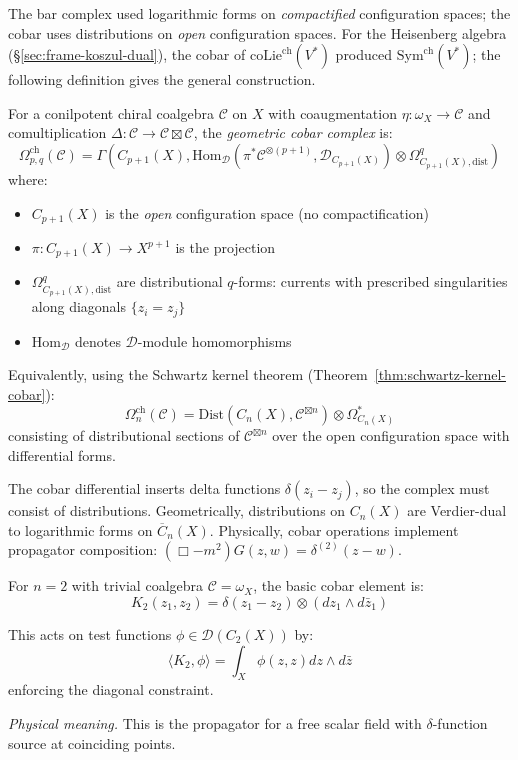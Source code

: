 \begin{definition}\label{def:geom-cobar}
The bar complex used logarithmic forms on \emph{compactified} configuration spaces; the cobar uses distributions on \emph{open} configuration spaces.  For the Heisenberg algebra (\S\ref{sec:frame-koszul-dual}), the cobar of $\mathrm{coLie}^{\mathrm{ch}}(V^*)$ produced $\mathrm{Sym}^{\mathrm{ch}}(V^*)$; the following definition gives the general construction.

For a conilpotent chiral coalgebra $\mathcal{C}$ on $X$ with coaugmentation
$\eta: \omega_X \to \mathcal{C}$ and comultiplication $\Delta: \mathcal{C} \to
\mathcal{C} \boxtimes \mathcal{C}$, the \emph{geometric cobar complex} is:
\[
\Omega^{\text{ch}}_{p,q}(\mathcal{C}) = \Gamma\left(C_{p+1}(X), \text{Hom}_{\mathcal{D}}(\pi^*\mathcal{C}^{\otimes(p+1)}, \mathcal{D}_{C_{p+1}(X)}) \otimes \Omega^q_{C_{p+1}(X),\text{dist}}\right)
\]
where:
\begin{itemize}
\item $C_{p+1}(X)$ is the \emph{open} configuration space (no compactification)
\item $\pi: C_{p+1}(X) \to X^{p+1}$ is the projection
\item $\Omega^q_{C_{p+1}(X),\text{dist}}$ are distributional $q$-forms: currents with 
prescribed singularities along diagonals $\{z_i = z_j\}$
\item $\text{Hom}_{\mathcal{D}}$ denotes $\mathcal{D}$-module homomorphisms
\end{itemize}

Equivalently, using the Schwartz kernel theorem (Theorem~\ref{thm:schwartz-kernel-cobar}):
\[\Omega^{\text{ch}}_n(\mathcal{C}) = \text{Dist}\left(C_n(X), \mathcal{C}^{\boxtimes n}\right) 
\otimes \Omega^*_{C_n(X)}\]
consisting of distributional sections of $\mathcal{C}^{\boxtimes n}$ over the open 
configuration space with differential forms.
\end{definition}

\begin{remark}[Distributions]\label{rem:why-distributions}
The cobar differential inserts delta functions $\delta(z_i - z_j)$, so the complex must consist of distributions.  Geometrically, distributions on $C_n(X)$ are Verdier-dual to logarithmic forms on $\overline{C}_n(X)$.  Physically, cobar operations implement propagator composition: $(\Box - m^2) G(z,w) = \delta^{(2)}(z - w)$.
\end{remark}

\begin{example}\label{ex:simplest-cobar}
For $n=2$ with trivial coalgebra $\mathcal{C} = \omega_X$, the basic cobar element is:
\[K_2(z_1, z_2) = \delta(z_1 - z_2) \otimes (dz_1 \wedge d\bar{z}_1)\]

This acts on test functions $\phi \in \mathcal{D}(C_2(X))$ by:
\[\langle K_2, \phi \rangle = \int_X \phi(z, z) dz \wedge d\bar{z}\]
enforcing the diagonal constraint.

\emph{Physical meaning.} This is the propagator for a free scalar field with
$\delta$-function source at coinciding points.
\end{example}

